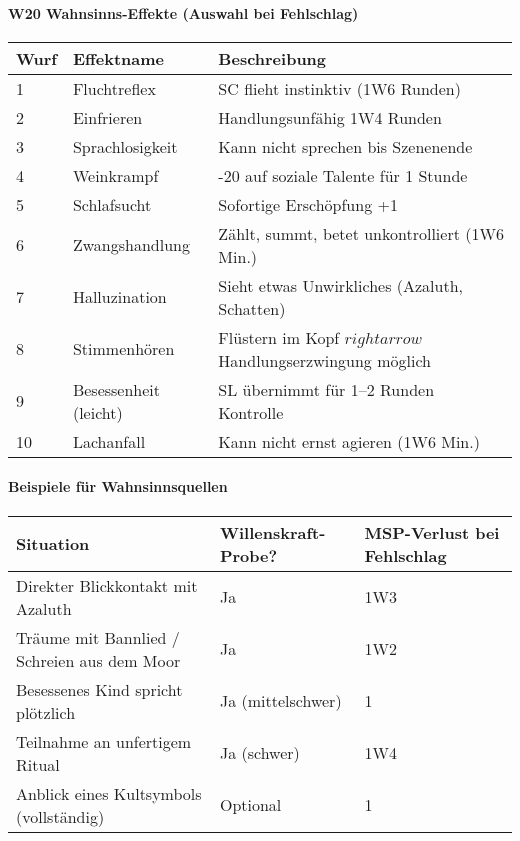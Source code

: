 \paragraph{W20 Wahnsinns-Effekte (Auswahl bei Fehlschlag)}
\begin{center}
\begin{tabular}{lll}
\toprule
\textbf{Wurf} & \textbf{Effektname} & \textbf{Beschreibung}\\
\midrule 
1 & Fluchtreflex & SC flieht instinktiv (1W6 Runden)\\
\midrule 
2 & Einfrieren & Handlungsunfähig 1W4 Runden\\
\midrule 
3 & Sprachlosigkeit & Kann nicht sprechen bis Szenenende\\
\midrule 
4 & Weinkrampf & -20 auf soziale Talente für 1 Stunde\\
\midrule 
5 & Schlafsucht & Sofortige Erschöpfung +1\\
\midrule 
6 & Zwangshandlung & Zählt, summt, betet unkontrolliert (1W6 Min.)\\
\midrule 
7 & Halluzination & Sieht etwas Unwirkliches (Azaluth, Schatten)\\
\midrule 
8 & Stimmenhören & Flüstern im Kopf $rightarrow$ Handlungserzwingung möglich\\
\midrule 
9 & Besessenheit (leicht) & SL übernimmt für 1–2 Runden Kontrolle\\
\midrule 
10 & Lachanfall & Kann nicht ernst agieren (1W6 Min.)\\
\bottomrule
\end{tabular} 
\end{center}

\paragraph{Beispiele für Wahnsinnsquellen}
\begin{center}
\begin{tabular}{lll}
\toprule
\textbf{Situation} & \textbf{Willenskraft-Probe?} & \textbf{MSP-Verlust bei Fehlschlag}\\
\midrule 
Direkter Blickkontakt mit Azaluth & Ja & 1W3\\
\midrule 
Träume mit Bannlied / Schreien aus dem Moor & Ja & 1W2\\
\midrule 
Besessenes Kind spricht plötzlich & Ja (mittelschwer) & 1\\
\midrule 
Teilnahme an unfertigem Ritual & Ja (schwer) & 1W4\\
\midrule 
Anblick eines Kultsymbols (vollständig) & Optional & 1\\
\bottomrule
\end{tabular} 
\end{center}

